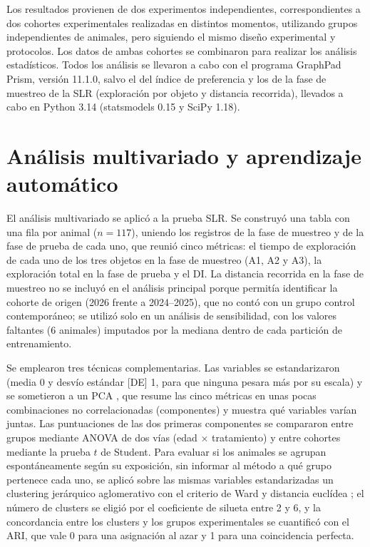 Los resultados provienen de dos experimentos independientes, correspondientes a dos cohortes experimentales realizadas en distintos momentos, utilizando grupos independientes de animales, pero siguiendo el mismo diseño experimental y protocolos. Los datos de ambas cohortes se combinaron para realizar los análisis estadísticos. Todos los análisis se llevaron a cabo con el programa GraphPad Prism, versión 11.1.0, salvo el del índice de preferencia y los de la fase de muestreo de la SLR (exploración por objeto y distancia recorrida), llevados a cabo en Python 3.14 (statsmodels 0.15 y SciPy 1.18).

\section{Análisis multivariado y aprendizaje automático}\label{sec:ml}

El análisis multivariado se aplicó a la prueba SLR. Se construyó una tabla con una fila por animal ($n = 117$), uniendo los registros de la fase de muestreo y de la fase de prueba de cada uno, que reunió cinco métricas: el tiempo de exploración de cada uno de los tres objetos en la fase de muestreo (A1, A2 y A3), la exploración total en la fase de prueba y el DI. La distancia recorrida en la fase de muestreo no se incluyó en el análisis principal porque permitía identificar la cohorte de origen (2026 frente a 2024--2025), que no contó con un grupo control contemporáneo; se utilizó solo en un análisis de sensibilidad, con los valores faltantes (6 animales) imputados por la mediana dentro de cada partición de entrenamiento.

Se emplearon tres técnicas complementarias. Las variables se estandarizaron (media 0 y desvío estándar [DE] 1, para que ninguna pesara más por su escala) y se sometieron a un PCA \cite{jolliffe2016pca}, que resume las cinco métricas en unas pocas combinaciones no correlacionadas (componentes) y muestra qué variables varían juntas. Las puntuaciones de las dos primeras componentes se compararon entre grupos mediante ANOVA de dos vías (edad $\times$ tratamiento) y entre cohortes mediante la prueba $t$ de Student. Para evaluar si los animales se agrupan espontáneamente según su exposición, sin informar al método a qué grupo pertenece cada uno, se aplicó sobre las mismas variables estandarizadas un clustering jerárquico aglomerativo con el criterio de Ward y distancia euclídea \cite{ward1963hierarchical}; el número de clusters se eligió por el coeficiente de silueta entre 2 y 6, y la concordancia entre los clusters y los grupos experimentales se cuantificó con el ARI, que vale 0 para una asignación al azar y 1 para una coincidencia perfecta.

